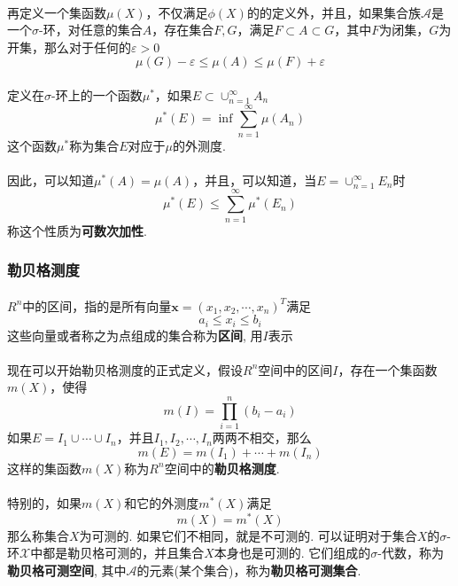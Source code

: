 \paragraph{}
再定义一个集函数$\mu(X)$，不仅满足$\phi(X)$的的定义外，并且，如果集合族$\mathcal{A}$是一个$\sigma$-环，对任意的集合$A$，存在集合$F, G$，满足$F \subset A \subset G$，其中$F$为闭集，$G$为开集，那么对于任何的$\varepsilon > 0$
$$
\mu(G) - \varepsilon \leq \mu(A) \leq \mu(F) + \varepsilon
$$

\paragraph{}
定义在$\sigma$-环上的一个函数$\mu^*$，如果$E\subset \cup_{n=1}^\infty A_n$
$$
\mu^*(E) = \inf \sum_{n=1}^\infty \mu(A_n)
$$
这个函数$\mu^*$称为集合$E$对应于$\mu$的外测度.

\paragraph{}
因此，可以知道$\mu^*(A) = \mu(A)$，并且，可以知道，当$E = \cup_{n=1}^\infty E_n$时
$$
\mu^*(E) \leq \sum_{n=1}^\infty \mu^* (E_n)
$$
称这个性质为\textbf{可数次加性}.



\subsubsection{勒贝格测度}
\paragraph{}
$R^n$中的区间，指的是所有向量$\textbf{x} = (x_1, x_2, \cdots, x_n)^T$满足
$$
a_i \leq x_i \leq b_i
$$
这些向量或者称之为点组成的集合称为\textbf{区间}, 用$I$表示

\paragraph{}
现在可以开始勒贝格测度的正式定义，假设$R^n$空间中的区间$I$，存在一个集函数$m(X)$，使得
$$
m(I) = \prod_{i=1}^n (b_i - a_i)
$$
如果$E = I_1 \cup \cdots \cup I_n$，并且$I_1, I_2, \cdots, I_n$两两不相交，那么
$$
m(E) = m(I_1) + \cdots + m(I_n)
$$
这样的集函数$m(X)$称为$R^n$空间中的\textbf{勒贝格测度}. 

\paragraph{}
特别的，如果$m(X)$和它的外测度$m^*(X)$满足
$$
m(X) = m^*(X)
$$
那么称集合$X$为可测的. 如果它们不相同，就是不可测的.  可以证明对于集合$X$的$\sigma$-环$\mathcal{X}$中都是勒贝格可测的，并且集合$X$本身也是可测的. 它们组成的$\sigma$-代数，称为\textbf{勒贝格可测空间}, 其中$\mathcal{A}$的元素(某个集合)，称为\textbf{勒贝格可测集合}.

